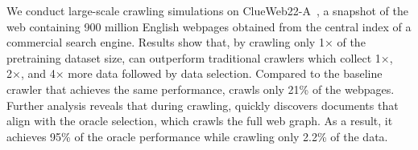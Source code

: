 We conduct large-scale crawling simulations on ClueWeb22-A~\citep{clueweb22}, a snapshot of the web containing 900 million English webpages obtained from the central index of a commercial search engine.
Results show that, by crawling only 1× of the pretraining dataset size, \ours{} can outperform traditional crawlers which collect 1×, 2×, and 4× more data followed by data selection.
Compared to the baseline crawler that achieves the same performance, \ours{} crawls only 21\% of the webpages. 
Further analysis reveals that during crawling, \ours{} quickly discovers documents that align with the oracle selection, which crawls the full web graph. As a result, it achieves 95\% of the oracle performance while crawling only 2.2\% of the data.
